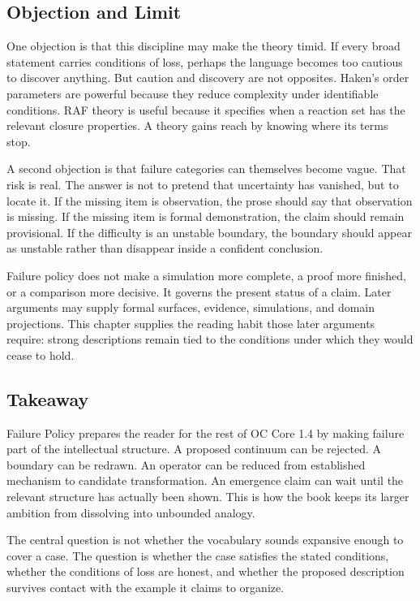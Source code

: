 \documentclass[11pt,a4paper,openany]{book}
\begin{document}
\subsection{Objection and Limit}
One objection is that this discipline may make the theory timid. If every broad statement carries conditions of loss, perhaps the language becomes too cautious to discover anything. But caution and discovery are not opposites. Haken's order parameters are powerful because they reduce complexity under identifiable conditions. RAF theory is useful because it specifies when a reaction set has the relevant closure properties. A theory gains reach by knowing where its terms stop. \cite{haken_synergetics,nicolis_prigogine_selforg}\par
A second objection is that failure categories can themselves become vague. That risk is real. The answer is not to pretend that uncertainty has vanished, but to locate it. If the missing item is observation, the prose should say that observation is missing. If the missing item is formal demonstration, the claim should remain provisional. If the difficulty is an unstable boundary, the boundary should appear as unstable rather than disappear inside a confident conclusion.\par
Failure policy does not make a simulation more complete, a proof more finished, or a comparison more decisive. It governs the present status of a claim. Later arguments may supply formal surfaces, evidence, simulations, and domain projections. This chapter supplies the reading habit those later arguments require: strong descriptions remain tied to the conditions under which they would cease to hold.\par
\subsection{Takeaway}
Failure Policy prepares the reader for the rest of OC Core 1.4 by making failure part of the intellectual structure. A proposed continuum can be rejected. A boundary can be redrawn. An operator can be reduced from established mechanism to candidate transformation. An emergence claim can wait until the relevant structure has actually been shown. This is how the book keeps its larger ambition from dissolving into unbounded analogy. \cite{haken_synergetics,nicolis_prigogine_selforg}\par
The central question is not whether the vocabulary sounds expansive enough to cover a case. The question is whether the case satisfies the stated conditions, whether the conditions of loss are honest, and whether the proposed description survives contact with the example it claims to organize.\par
\end{document}
